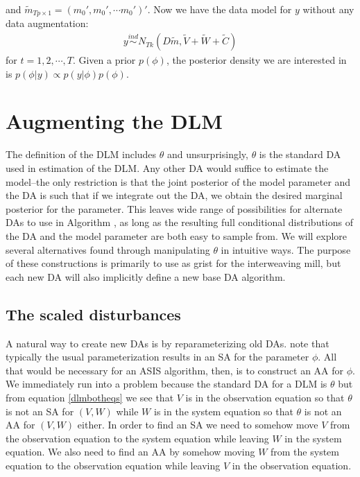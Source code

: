 \documentclass{article}
\begin{document}
and $\tilde{m}_{Tp\times 1} = (m_0', m_0', \cdots m_0')'$. Now we have the data model for $y$ without any data augmentation:
\begin{align}
  y \stackrel{ind}{\sim} N_{Tk}(D\tilde{m}, \tilde{V} + \tilde{W} + \tilde{C}) \label{margmodel}
\end{align}
for $t=1,2,\cdots,T$. Given a prior $p(\phi)$, the posterior density we are interested in is $p(\phi|y)\propto p(y|\phi)p(\phi)$.

\section{Augmenting the DLM}\label{sec:DAs}
The definition of the DLM includes $\theta$ and unsurprisingly, $\theta$ is the standard DA used in estimation of the DLM. Any other DA would suffice to estimate the model--the only restriction is that the joint posterior of the model parameter and the DA is such that if we integrate out the DA, we obtain the desired marginal posterior for the parameter. This leaves wide range of possibilities for alternate DAs to use in Algorithm , as long as the resulting full conditional distributions of the DA and the model parameter are both easy to sample from. We will explore several alternatives found through manipulating $\theta$ in intuitive ways. The purpose of these constructions is primarily to use as grist for the interweaving mill, but each new DA will also implicitly define a new base DA algorithm.

\subsection{The scaled disturbances}\label{sec:DAs:dist}

A natural way to create new DAs is by reparameterizing old DAs.  note that typically the usual parameterization results in an SA for the parameter $\phi$. All that would be necessary for an ASIS algorithm, then, is to construct an AA for $\phi$. We immediately run into a problem because the standard DA for a DLM is $\theta$ but from equation \eqref{dlmbotheqs} we see that $V$ is in the observation equation so that $\theta$ is not an SA for $(V,W)$ while $W$ is in the system equation so that $\theta$ is not an AA for $(V,W)$ either. In order to find an SA we need to somehow move $V$ from the observation equation to the system equation while leaving $W$ in the system equation. We also need to find an AA by somehow moving $W$ from the system equation to the observation equation while leaving $V$ in the observation equation. 
\end{document}
